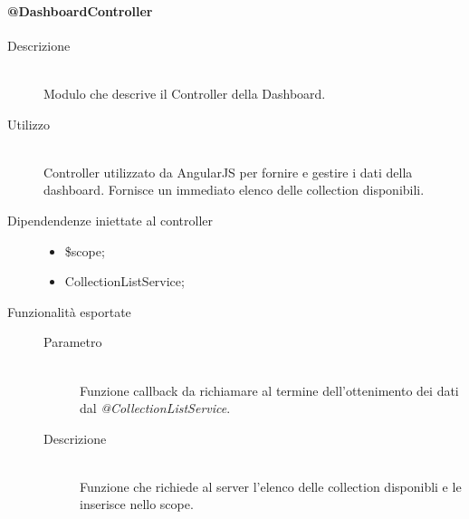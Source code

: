 \paragraph{@DashboardController}
\begin{description}
 \item[Descrizione] \hfill \\
 Modulo che descrive il Controller della Dashboard.
 
 \item[Utilizzo] \hfill \\
 Controller utilizzato da AngularJS per fornire e gestire i dati della dashboard.
Fornisce un immediato elenco delle collection disponibili.
 
 \item[Dipendendenze iniettate al controller] \hfill
 \begin{itemize}
  \item \$scope;
  \item CollectionListService;
 \end{itemize}
 
 \item[Funzionalità esportate]
 \begin{mldescription}
  \begin{description}
  	\item[Parametro]
  		\begin{mldescription}
  			 \hfill \\
        Funzione callback da richiamare al termine dell'ottenimento dei dati dal \textit{@CollectionListService}.
  		\end{mldescription}
  	\item[Descrizione] \hfill \\
    Funzione che richiede al server l'elenco delle collection disponibli e le inserisce nello scope.
  \end{description}
 \end{mldescription}
\end{description}


